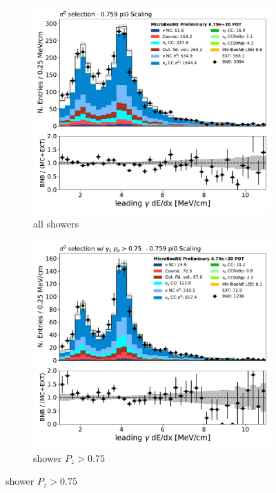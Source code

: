 \begin{figure}[H] 
\begin{center}
    \begin{subfigure}[b]{0.4\textwidth}
    \centering
    \includegraphics[width=1.00\textwidth]{pi0/calorimetry/pi0_dedx1_fit_Ypi0_dedx1_fit_Y_run123.pdf}
    \caption{all showers}
    \end{subfigure}
    \begin{subfigure}[b]{0.4\textwidth}
    \centering
    \includegraphics[width=1.00\textwidth]{pi0/calorimetry/pi0_dedx1_fit_Ypi0_dedx1_fit_Y_pz075_run123.pdf}
    \caption{shower $P_z > 0.75$}
    \end{subfigure}
    

\end{center}
\end{figure}
